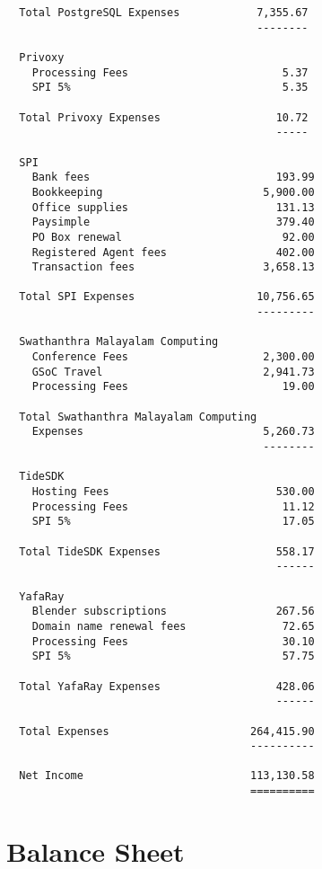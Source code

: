 \documentclass[letterpaper]{report}
\begin{document}
\begin{verbatim}
  Total PostgreSQL Expenses            7,355.67
                                       --------

  Privoxy
    Processing Fees                        5.37
    SPI 5%                                 5.35

  Total Privoxy Expenses                  10.72
                                          -----

  SPI
    Bank fees                             193.99
    Bookkeeping                         5,900.00
    Office supplies                       131.13
    Paysimple                             379.40
    PO Box renewal                         92.00
    Registered Agent fees                 402.00
    Transaction fees                    3,658.13

  Total SPI Expenses                   10,756.65
                                       ---------

  Swathanthra Malayalam Computing
    Conference Fees                     2,300.00
    GSoC Travel                         2,941.73
    Processing Fees                        19.00

  Total Swathanthra Malayalam Computing
    Expenses                            5,260.73
                                        --------

  TideSDK
    Hosting Fees                          530.00
    Processing Fees                        11.12
    SPI 5%                                 17.05

  Total TideSDK Expenses                  558.17
                                          ------

  YafaRay
    Blender subscriptions                 267.56
    Domain name renewal fees               72.65
    Processing Fees                        30.10
    SPI 5%                                 57.75

  Total YafaRay Expenses                  428.06
                                          ------

  Total Expenses                      264,415.90
                                      ----------

  Net Income                          113,130.58
                                      ==========
\end{verbatim}

\section{Balance Sheet}
\end{document}
